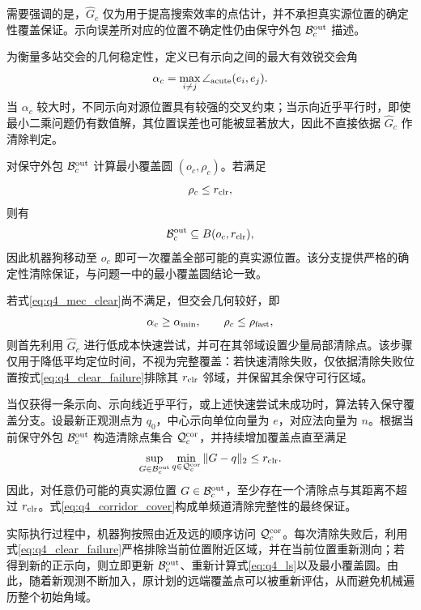 \documentclass[zihao=-4,a4paper,UTF8,fontset=none]{ctexart}
\begin{document}
需要强调的是，$\widehat G_c$ 仅为用于提高搜索效率的点估计，并不承担真实源位置的确定性覆盖保证。示向误差所对应的位置不确定性仍由保守外包 $\mathcal B_c^{\rm out}$ 描述。

为衡量多站交会的几何稳定性，定义已有示向之间的最大有效锐交会角
\begin{equation}
\alpha_c=
\max_{i\ne j}
\angle_{\rm acute}(e_i,e_j).
\label{eq:q4_acute_angle}
\end{equation}
当 $\alpha_c$ 较大时，不同示向对源位置具有较强的交叉约束；当示向近乎平行时，即使最小二乘问题仍有数值解，其位置误差也可能被显著放大，因此不直接依据 $\widehat G_c$ 作清除判定。

对保守外包 $\mathcal B_c^{\rm out}$ 计算最小覆盖圆 $(o_c,\rho_c)$。若满足
\begin{equation}
\rho_c\le r_{\rm clr},
\label{eq:q4_mec_clear}
\end{equation}
则有
\[
\mathcal B_c^{\rm out}\subseteq B(o_c,r_{\rm clr}),
\]
因此机器狗移动至 $o_c$ 即可一次覆盖全部可能的真实源位置。该分支提供严格的确定性清除保证，与问题一中的最小覆盖圆结论一致。

若式\eqref{eq:q4_mec_clear}尚不满足，但交会几何较好，即
\[
\alpha_c\ge\alpha_{\min},
\qquad
\rho_c\le\rho_{\rm fast},
\]
则首先利用 $\widehat G_c$ 进行低成本快速尝试，并可在其邻域设置少量局部清除点。该步骤仅用于降低平均定位时间，不视为完整覆盖：若快速清除失败，仅依据清除失败位置按式\eqref{eq:q4_clear_failure}排除其 $r_{\rm clr}$ 邻域，并保留其余保守可行区域。

当仅获得一条示向、示向线近乎平行，或上述快速尝试未成功时，算法转入保守覆盖分支。设最新正观测点为 $q_0$，中心示向单位向量为 $e$，对应法向量为 $n$。根据当前保守外包 $\mathcal B_c^{\rm out}$ 构造清除点集合 $\mathcal Q_c^{\rm cor}$，并持续增加覆盖点直至满足
\begin{equation}
\sup_{G\in\mathcal B_c^{\rm out}}
\min_{q\in\mathcal Q_c^{\rm cor}}
\|G-q\|_2
\le r_{\rm clr}.
\label{eq:q4_corridor_cover}
\end{equation}
因此，对任意仍可能的真实源位置 $G\in\mathcal B_c^{\rm out}$，至少存在一个清除点与其距离不超过 $r_{\rm clr}$。式\eqref{eq:q4_corridor_cover}构成单频道清除完整性的最终保证。

实际执行过程中，机器狗按照由近及远的顺序访问 $\mathcal Q_c^{\rm cor}$。每次清除失败后，利用式\eqref{eq:q4_clear_failure}严格排除当前位置附近区域，并在当前位置重新测向；若得到新的正示向，则立即更新 $\mathcal B_c^{\rm out}$、重新计算式\eqref{eq:q4_ls}以及最小覆盖圆。由此，随着新观测不断加入，原计划的远端覆盖点可以被重新评估，从而避免机械遍历整个初始角域。
\end{document}
